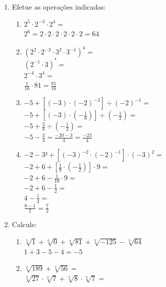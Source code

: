 \documentclass[a4paper, 12pt]{article}
\begin{document}
\begin{enumerate}
\item Efetue as operações indicadas:
  \begin{enumerate}
  \item $ 2^{5} \cdot 2^{-3} \cdot 2^4 = $ \\
    $ 2^6 = 2 \cdot 2 \cdot 2 \cdot 2 \cdot 2 \cdot 2 = 64 $ \\
  \item $ \left ( 2^2 \cdot 2^{-3} \cdot 3^2 \cdot 3^{-1} \right )^4 = $ \\
    $ \left ( 2^{-1} \cdot 3 \right )^{⁴} = $ \\
    $ 2^{-4} \cdot 3^{4} = $ \\
    $ \frac{1}{16} \cdot 81 = \frac{81}{16} $ \\
  \item $ -5 + \left [ \left (-3 \right ) \cdot \left (-2 \right )^{-3} \right ] \div \left (-2 \right )^{-1} = $ \\
    $ -5 + \left [ \left (-3 \right ) \cdot \left (-\frac{1}{8} \right ) \right ] \div \left (-\frac{1}{2} \right ) = $ \\
    $ -5 + \frac{3}{8} \div \left (-\frac{1}{2} \right ) = $ \\
    $ -5 - \frac{3}{4} = \frac{-20-3}{4} = \frac{-23}{4} $ \\
  \item $ -2 -3² + \left [ \left ( -3 \right )^{-2} \cdot \left ( -2 \right )^{-1} \right ] \cdot \left ( -3 \right )^2 = $ \\
    $ -2 + 6 + \left [ \frac{1}{9} \cdot \left (- \frac{1}{2} \right ) \right ] \cdot 9 = $ \\
    $ -2 + 6 - \frac{1}{18} \cdot 9 = $ \\
    $ -2 + 6 - \frac{1}{2} = $ \\
    $ 4 - \frac{1}{2} = $ \\
    $ \frac{8-1}{2} = \frac{7}{2} $ \\            
  \end{enumerate}
\item Calcule:
  \begin{enumerate}
  \item $ \sqrt[5]{1} + \sqrt[6]{0} + \sqrt[4]{81} + \sqrt[3]{-125} - \sqrt[3]{64} $ \\
   $ 1 + 3 - 5 - 4 = -5 $ \\
  \item $ \sqrt[3]{189} + \sqrt[3]{56} = $ \\
    $ \sqrt[3]{27} \cdot \sqrt[3]{7} + \sqrt[3]{8} \cdot \sqrt[3]{7} = $ \\

\end{enumerate}
\end{enumerate}
\end{document}
